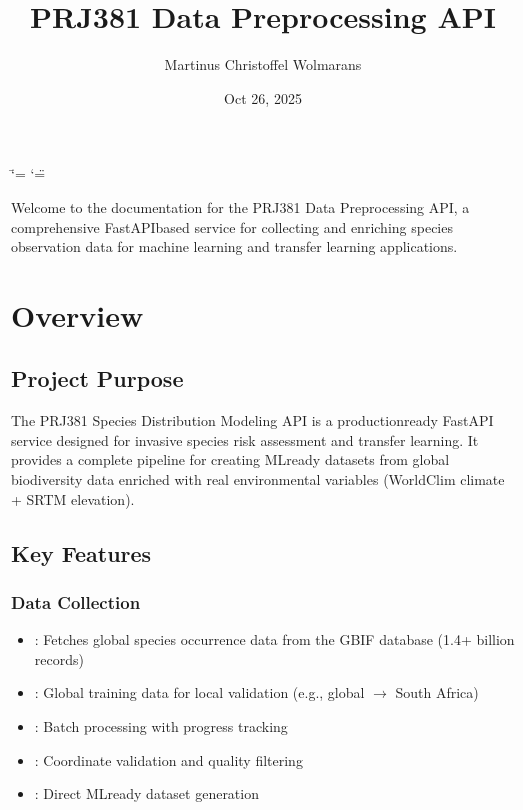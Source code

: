 \documentclass[letterpaper,10pt,english]{sphinxmanual}
\title{PRJ381 Data Preprocessing API}
\date{Oct 26, 2025}
\author{Martinus Christoffel Wolmarans}
\begin{document}
\ifdefined\shorthandoff
  \ifnum\catcode`\=\string=\active\shorthandoff{=}\fi
  \ifnum\catcode`\"=\active{}\fi
\fi

\pagestyle{empty}
\sphinxmaketitle
\pagestyle{plain}
\sphinxtableofcontents
\pagestyle{normal}
\label{\detokenize{index::doc}}


\sphinxAtStartPar
Welcome to the documentation for the PRJ381 Data Preprocessing API, a comprehensive FastAPI\sphinxhyphen{}based service for collecting and enriching species observation data for machine learning and transfer learning applications.

\sphinxstepscope


\chapter{Overview}
\label{\detokenize{overview:overview}}\label{\detokenize{overview::doc}}

\section{Project Purpose}
\label{\detokenize{overview:project-purpose}}
\sphinxAtStartPar
The PRJ381 Species Distribution Modeling API is a production\sphinxhyphen{}ready FastAPI service designed for invasive species risk assessment and transfer learning. It provides a complete pipeline for creating ML\sphinxhyphen{}ready datasets from global biodiversity data enriched with real environmental variables (WorldClim climate + SRTM elevation).


\section{Key Features}
\label{\detokenize{overview:key-features}}

\subsection{Data Collection}
\label{\detokenize{overview:data-collection}}\begin{itemize}
\item {} 
\sphinxAtStartPar
{}: Fetches global species occurrence data from the GBIF database (1.4+ billion records)

\item {} 
\sphinxAtStartPar
{}: Global training data for local validation (e.g., global \(\rightarrow\) South Africa)

\item {} 
\sphinxAtStartPar
{}: Batch processing with progress tracking

\item {} 
\sphinxAtStartPar
{}: Coordinate validation and quality filtering

\item {} 
\sphinxAtStartPar
{}: Direct ML\sphinxhyphen{}ready dataset generation

\end{itemize}
\end{document}
